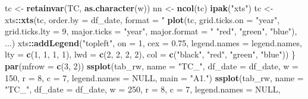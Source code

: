 \documentclass[]{elsarticle} %
\newenvironment{Shaded}{\begin{snugshade}}{\end{snugshade}}
\newcommand{\KeywordTok}[1]{\textcolor[rgb]{0.13,0.29,0.53}{\textbf{#1}}}
\newcommand{\DataTypeTok}[1]{\textcolor[rgb]{0.13,0.29,0.53}{#1}}
\newcommand{\DecValTok}[1]{\textcolor[rgb]{0.00,0.00,0.81}{#1}}
\newcommand{\FloatTok}[1]{\textcolor[rgb]{0.00,0.00,0.81}{#1}}
\newcommand{\StringTok}[1]{\textcolor[rgb]{0.31,0.60,0.02}{#1}}
\newcommand{\OtherTok}[1]{\textcolor[rgb]{0.56,0.35,0.01}{#1}}
\newcommand{\OperatorTok}[1]{\textcolor[rgb]{0.81,0.36,0.00}{\textbf{#1}}}
\newcommand{\NormalTok}[1]{#1}
\begin{document}
\begin{Shaded}
\begin{Highlighting}[]
{\NormalTok{    tc <-}\StringTok{ }\KeywordTok{retainvar}\NormalTok{(TC, }\KeywordTok{as.character}\NormalTok{(w))}
\NormalTok{    nn <-}\StringTok{ }\KeywordTok{ncol}\NormalTok{(tc)}
    \KeywordTok{ipak}\NormalTok{(}\StringTok{"xts"}\NormalTok{)}
\NormalTok{    tc <-}\StringTok{ }\NormalTok{xts}\OperatorTok{::}\KeywordTok{xts}\NormalTok{(tc, }\DataTypeTok{order.by =}\NormalTok{ df_date, }\DataTypeTok{format =} \StringTok{"%
    \KeywordTok{plot}\NormalTok{(tc, }\DataTypeTok{grid.ticks.on =} \StringTok{"year"}\NormalTok{, }\DataTypeTok{grid.ticks.lty =} \DecValTok{9}\NormalTok{, }\DataTypeTok{major.ticks =} \StringTok{"year"}\NormalTok{, }
        \DataTypeTok{major.format =} \StringTok{"%
            \StringTok{"red"}\NormalTok{, }\StringTok{"green"}\NormalTok{, }\StringTok{"blue"}\NormalTok{), ...)}
\NormalTok{    xts}\OperatorTok{::}\KeywordTok{addLegend}\NormalTok{(}\StringTok{"topleft"}\NormalTok{, }\DataTypeTok{on =} \DecValTok{1}\NormalTok{, }\DataTypeTok{cex =} \FloatTok{0.75}\NormalTok{, }\DataTypeTok{legend.names =}\NormalTok{ legend.names, }
        \DataTypeTok{lty =} \KeywordTok{c}\NormalTok{(}\DecValTok{1}\NormalTok{, }\DecValTok{1}\NormalTok{, }\DecValTok{1}\NormalTok{, }\DecValTok{1}\NormalTok{), }\DataTypeTok{lwd =} \KeywordTok{c}\NormalTok{(}\DecValTok{2}\NormalTok{, }\DecValTok{2}\NormalTok{, }\DecValTok{2}\NormalTok{, }\DecValTok{2}\NormalTok{), }\DataTypeTok{col =} \KeywordTok{c}\NormalTok{(}\StringTok{"black"}\NormalTok{, }\StringTok{"red"}\NormalTok{, }\StringTok{"green"}\NormalTok{, }
            \StringTok{"blue"}\NormalTok{))}
\NormalTok{\}}
\KeywordTok{par}\NormalTok{(}\DataTypeTok{mfrow =} \KeywordTok{c}\NormalTok{(}\DecValTok{3}\NormalTok{, }\DecValTok{2}\NormalTok{))}
\KeywordTok{ssplot}\NormalTok{(tab_rw, }\DataTypeTok{name =} \StringTok{"TC_"}\NormalTok{, }\DataTypeTok{df_date =}\NormalTok{ df_date, }\DataTypeTok{w =} \DecValTok{150}\NormalTok{, }\DataTypeTok{r =} \DecValTok{8}\NormalTok{, }\DataTypeTok{c =} \DecValTok{7}\NormalTok{, }\DataTypeTok{legend.names =} \OtherTok{NULL}\NormalTok{, }
    \DataTypeTok{main =} \StringTok{"A1."}\NormalTok{)}
\KeywordTok{ssplot}\NormalTok{(tab_rw, }\DataTypeTok{name =} \StringTok{"TC_"}\NormalTok{, }\DataTypeTok{df_date =}\NormalTok{ df_date, }\DataTypeTok{w =} \DecValTok{250}\NormalTok{, }\DataTypeTok{r =} \DecValTok{8}\NormalTok{, }\DataTypeTok{c =} \DecValTok{7}\NormalTok{, }\DataTypeTok{legend.names =} \OtherTok{NULL}\NormalTok{, }
}}}
\end{Highlighting}
\end{Shaded}
\end{document}
